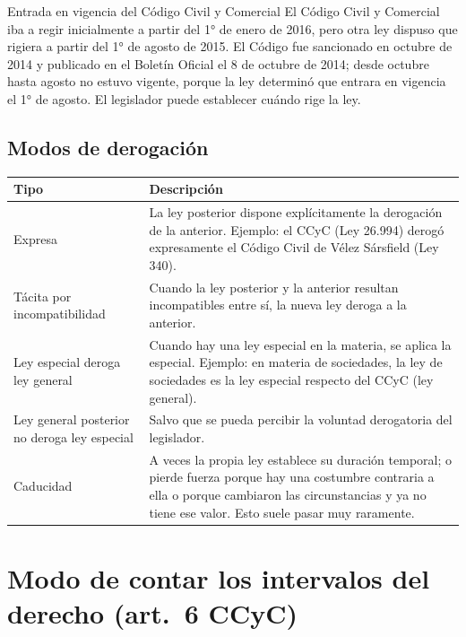 \documentclass[12pt,oneside]{book}
\begin{document}
\begin{example}{Entrada en vigencia del Código Civil y Comercial}
El Código Civil y Comercial iba a regir inicialmente a partir del 1° de enero de 2016, pero otra ley dispuso que rigiera a partir del 1° de agosto de 2015. El Código fue sancionado en octubre de 2014 y publicado en el Boletín Oficial el 8 de octubre de 2014; desde octubre hasta agosto no estuvo vigente, porque la ley determinó que entrara en vigencia el 1° de agosto. El legislador puede establecer cuándo rige la ley.
\end{example}

\subsection{Modos de derogación}

\begin{table}[H]
\centering
\begin{tabularx}{\textwidth}{>{\raggedright\arraybackslash}p{} >{\raggedright\arraybackslash}X}
\toprule
\textbf{Tipo} & \textbf{Descripción} \\
\midrule
Expresa &
La ley posterior dispone explícitamente la derogación de la anterior. Ejemplo: el CCyC (Ley 26.994) derogó expresamente el Código Civil de Vélez Sársfield (Ley 340). \\
\addlinespace
Tácita por incompatibilidad &
Cuando la ley posterior y la anterior resultan incompatibles entre sí, la nueva ley deroga a la anterior. \\
\addlinespace
Ley especial deroga ley general &
Cuando hay una ley especial en la materia, se aplica la especial. Ejemplo: en materia de sociedades, la ley de sociedades es la ley especial respecto del CCyC (ley general). \\
\addlinespace
Ley general posterior no deroga ley especial &
Salvo que se pueda percibir la voluntad derogatoria del legislador. \\
\addlinespace
Caducidad &
A veces la propia ley establece su duración temporal; o pierde fuerza porque hay una costumbre contraria a ella o porque cambiaron las circunstancias y ya no tiene ese valor. Esto suele pasar muy raramente. \\
\bottomrule
\end{tabularx}
\end{table}

\section{Modo de contar los intervalos del derecho (art.~6 CCyC)}
\end{document}
